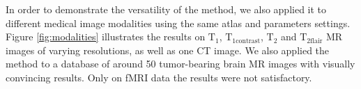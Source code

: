 \documentclass{InsightArticle}
\begin{document}
\begin{figure}[h]
\center
{}
\label{fig:brainweb}
\end{figure}

\newpage

In order to demonstrate the versatility of the method, we also applied it to different medical image modalities using the same atlas and parameters settings. Figure \ref{fig:modalities} illustrates the results on $\mathrm{T_1}$, $\mathrm{T_{1contrast}}$, $\mathrm{T_2}$ and $\mathrm{T_{2flair}}$ MR images of varying resolutions, as well as one CT image. We also applied the method to a database of around 50 tumor-bearing brain MR images with visually convincing results. Only on fMRI data the results were not satisfactory. 
\end{document}
